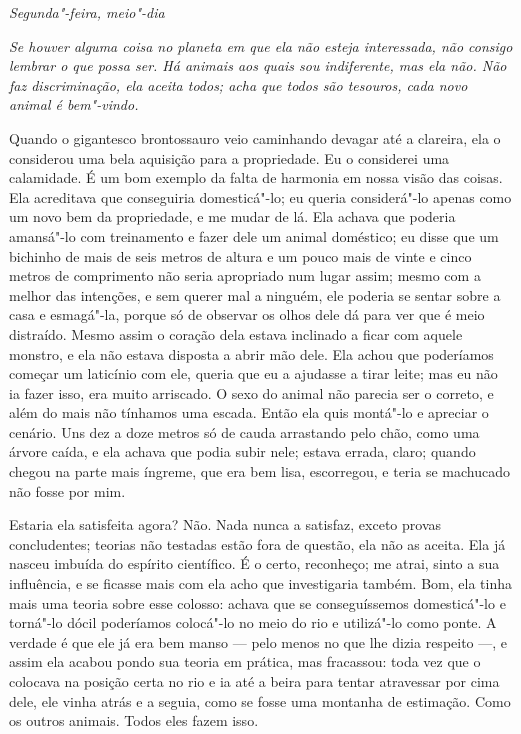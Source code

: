 \textit{Segunda"-feira, meio"-dia} {\itshape Se houver alguma coisa no planeta em que ela não
esteja interessada, não consigo lembrar o que possa ser. Há animais aos quais sou
indiferente, mas ela não. Não faz discriminação, ela aceita todos; acha que
todos são tesouros, cada novo animal é bem"-vindo.


Quando o gigantesco brontossauro veio caminhando devagar até a
clareira, ela o considerou uma bela aquisição para a propriedade. Eu o considerei
uma calamidade. É um bom exemplo da falta de harmonia em nossa visão
das coisas. Ela acreditava que conseguiria domesticá"-lo; eu queria considerá"-lo
apenas como um novo bem da propriedade, e me mudar de lá. Ela achava
que poderia amansá"-lo com treinamento e fazer dele um animal
doméstico; eu disse que um bichinho de mais de seis metros de altura e um pouco
mais de vinte e cinco metros de comprimento não seria apropriado num
lugar assim; mesmo com a melhor das intenções, e sem querer mal a ninguém,
ele poderia se sentar sobre a casa e esmagá"-la, porque só de observar os olhos
dele dá para ver que é meio distraído. Mesmo assim o coração dela estava
inclinado a ficar com aquele monstro, e ela não estava disposta a abrir mão dele. Ela achou
que poderíamos começar um laticínio com ele, queria que eu a ajudasse a tirar
leite; mas eu não ia fazer isso, era muito arriscado. O sexo do animal não parecia ser o
correto, e além do mais não tínhamos uma escada. Então ela quis montá"-lo e
apreciar o cenário. Uns dez a doze metros só de cauda arrastando pelo chão,
como uma árvore caída, e ela achava que podia subir nele; estava errada, claro;
quando chegou na parte mais íngreme, que era bem lisa, escorregou, e teria
se machucado não fosse por mim.

Estaria ela satisfeita agora? Não. Nada nunca a satisfaz, exceto provas concludentes;
teorias não testadas estão fora de questão, ela não as aceita. Ela já nasceu imbuída do espírito científico. 
É o certo, reconheço; me atrai, sinto a sua influência, e se ficasse mais com ela
acho que investigaria também. Bom, ela tinha mais uma teoria sobre esse
colosso: achava que se conseguíssemos domesticá"-lo e torná"-lo dócil
poderíamos colocá"-lo no meio do rio e utilizá"-lo como ponte. A verdade é que
ele já era bem manso --- pelo menos no que lhe dizia respeito ---, e assim
ela acabou pondo sua teoria em prática, mas fracassou: toda vez que o colocava na posição certa no
rio e ia até a beira para tentar atravessar por cima dele, ele vinha atrás e a
seguia, como se fosse uma montanha de estimação. Como os outros animais. Todos
eles fazem isso.
}

